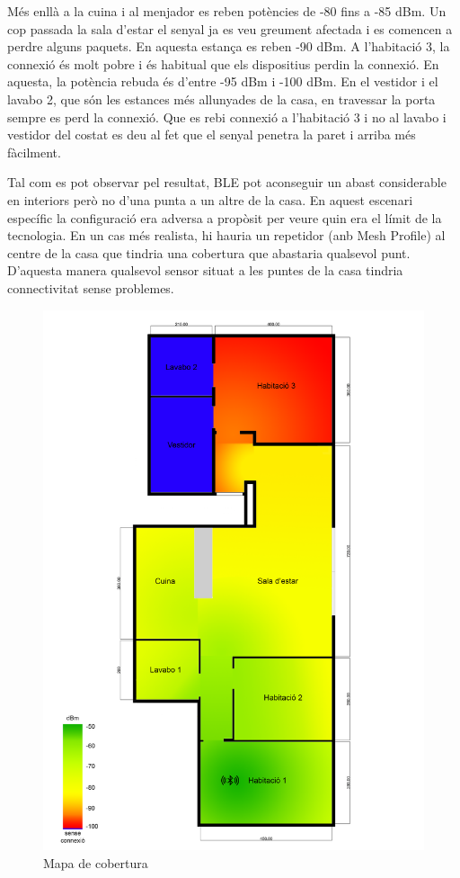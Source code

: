 Més enllà a la cuina i al menjador es reben potències de -80 fins a -85 dBm.
Un cop passada la sala d'estar el senyal ja es veu greument afectada i es comencen a perdre alguns paquets. En aquesta estança es reben -90 dBm. A l'habitació 3, la connexió és molt pobre i és habitual que els dispositius perdin la connexió. En aquesta, la potència rebuda és d'entre -95 dBm i -100 dBm.
En el vestidor i el lavabo 2, que són les estances més allunyades de la casa, en travessar la porta sempre es perd la connexió.
Que es rebi connexió a l'habitació 3 i no al lavabo i vestidor del costat es deu al fet que el senyal penetra la paret i arriba més fàcilment.

Tal com es pot observar pel resultat, BLE pot aconseguir un abast considerable en interiors però no d'una punta a un altre de la casa.
En aquest escenari específic la configuració era adversa a propòsit per veure quin era el límit de la tecnologia.
En un cas més realista, hi hauria un repetidor (anb Mesh Profile) al centre de la casa que tindria una cobertura que abastaria qualsevol punt.
D'aquesta manera qualsevol sensor situat a les puntes de la casa tindria connectivitat sense problemes.
\newpage

\begin{figure}[!h]
	\begin{center}
		\includegraphics[width=\textwidth]{./images/hotmap.png}
		\caption{Mapa de cobertura}
		\label{heatmap}
	\end{center}
\end{figure}

